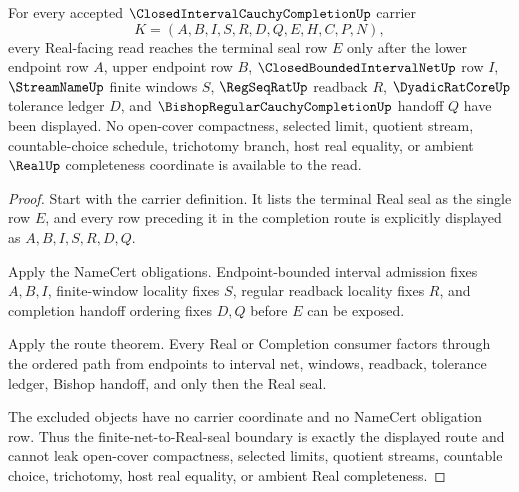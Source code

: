 \begin{theorem}
\label{thm:closed-interval-cauchy-completion-finite-net-real-seal}
For every accepted $\ClosedIntervalCauchyCompletionUp$ carrier
$$
K=(A,B,I,S,R,D,Q,E,H,C,P,N),
$$
every Real-facing read reaches the terminal seal row $E$ only after the lower endpoint row $A$, upper endpoint row $B$, $\ClosedBoundedIntervalNetUp$ row $I$, $\StreamNameUp$ finite windows $S$, $\RegSeqRatUp$ readback $R$, $\DyadicRatCoreUp$ tolerance ledger $D$, and $\BishopRegularCauchyCompletionUp$ handoff $Q$ have been displayed. No open-cover compactness, selected limit, quotient stream, countable-choice schedule, trichotomy branch, host real equality, or ambient $\RealUp$ completeness coordinate is available to the read.
\end{theorem}
\begin{proof}
Start with the carrier definition. It lists the terminal Real seal as the single row $E$, and every row preceding it in the completion route is explicitly displayed as $A,B,I,S,R,D,Q$.

Apply the NameCert obligations. Endpoint-bounded interval admission fixes $A,B,I$, finite-window locality fixes $S$, regular readback locality fixes $R$, and completion handoff ordering fixes $D,Q$ before $E$ can be exposed.

Apply the route theorem. Every Real or Completion consumer factors through the ordered path from endpoints to interval net, windows, readback, tolerance ledger, Bishop handoff, and only then the Real seal.

The excluded objects have no carrier coordinate and no NameCert obligation row. Thus the finite-net-to-Real-seal boundary is exactly the displayed route and cannot leak open-cover compactness, selected limits, quotient streams, countable choice, trichotomy, host real equality, or ambient Real completeness.
\end{proof}

